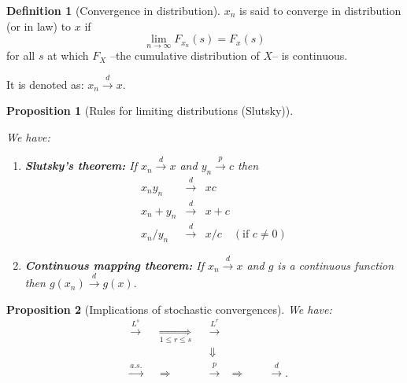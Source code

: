 \documentclass[
  12pt,
]{book}
\newtheorem{proposition}{Proposition}[chapter]
\theoremstyle{definition}
\newtheorem{definition}{Definition}[chapter]
\theoremstyle{definition}
\theoremstyle{definition}
\theoremstyle{definition}
\theoremstyle{remark}
\begin{document}
\begin{definition}[Convergence in distribution]
\protect\hypertarget{def:cvgceDistri}{}\label{def:cvgceDistri}\(x_n\) is said to converge in distribution (or in law) to \(x\) if
\[
\lim_{n \rightarrow \infty} F_{x_n}(s) = F_{x}(s)
\]
for all \(s\) at which \(F_X\) --the cumulative distribution of \(X\)-- is continuous.

It is denoted as: \(x_n \overset{d}{\rightarrow} x\).
\end{definition}

\begin{proposition}[Rules for limiting distributions (Slutsky)]
\protect\hypertarget{prp:Slutsky}{}\label{prp:Slutsky}

We have:

\begin{enumerate}
\def\labelenumi{\roman{enumi}.}
\item
  \textbf{Slutsky's theorem:} If \(x_n \overset{d}{\rightarrow} x\) and \(y_n \overset{p}{\rightarrow} c\) then
  \begin{eqnarray*}
  x_n y_n &\overset{d}{\rightarrow}& x c \\
  x_n + y_n &\overset{d}{\rightarrow}& x + c \\
  x_n/y_n &\overset{d}{\rightarrow}& x / c \quad (\mbox{if }c \ne 0)
  \end{eqnarray*}
\item
  \textbf{Continuous mapping theorem:} If \(x_n \overset{d}{\rightarrow} x\) and \(g\) is a continuous function then \(g(x_n) \overset{d}{\rightarrow} g(x).\)
\end{enumerate}

\end{proposition}

\begin{proposition}[Implications of stochastic convergences]
\protect\hypertarget{prp:implicationsconv}{}\label{prp:implicationsconv}We have:
\begin{align*}
&\boxed{\overset{L^s}{\rightarrow}}& &\underset{1 \le r \le s}{\Rightarrow}& &\boxed{\overset{L^r}{\rightarrow}}&\\
&& && &\Downarrow&\\
&\boxed{\overset{a.s.}{\rightarrow}}& &\Rightarrow& &\boxed{\overset{p}{\rightarrow}}& \Rightarrow \qquad \boxed{\overset{d}{\rightarrow}}.
\end{align*}
\end{proposition}
\end{document}
